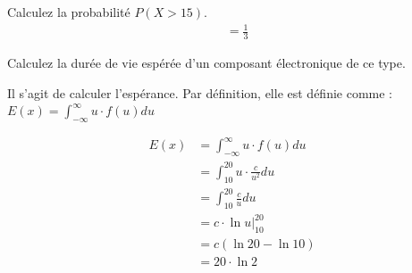 \begin{exo}
\begin{subexo}{Calculez la probabilité $P(X > 15)$.}
\begin{align*}
			&= \frac{1}{3}
		\end{align*}
	\end{subexo}
	\begin{subexo}{Calculez la durée de vie espérée d'un composant électronique de ce type.}
		\begin{center}
			Il s'agit de calculer l'espérance. Par définition, elle est définie comme : $E(x) = \displaystyle\int_{-\infty}^{\infty}{u\cdot f(u)}du$
		\end{center}
		\begin{align*}
			E(x) &= \displaystyle\int_{-\infty}^{\infty}{u\cdot f(u)}du \\
			&= \displaystyle\int_{10}^{20}{u \cdot \frac{c}{u^2}}du \\ 
			&= \displaystyle\int_{10}^{20}{\frac{c}{u}}du \\ 
			&= c\cdot \ln{u}\bigg\vert_{10}^{20} \\
			&= c (\ln{20} - \ln{10}) \\
			&= 20 \cdot \ln{2}
		\end{align*}
	\end{subexo}
\end{exo}
